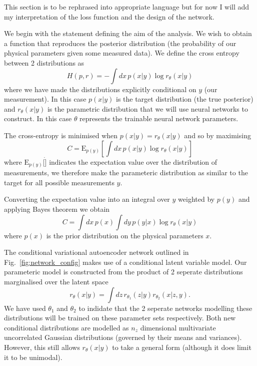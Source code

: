 \documentclass[%
showpacs,
 amsmath,amssymb,
 aps,
 twocolumn,
 prl,
 reprint,
floatfix,
]{revtex4-1}
\begin{document}
This section is to be rephrased into appropriate language but for now I will
add my interpretation of the loss function and the design of the network.

We begin with the statement defining the aim of the analysis. We wish to obtain
a function that reproduces the posterior distribution (the probability of our
physical parameters given some measured data). We define the cross entropy
between 2 distributions as
%
\begin{equation}\label{eq:cross_ent}
H(p,r) = -\int dx\, p(x|y) \log r_{\theta}(x|y)
\end{equation}
%
where we have made the distributions explicitly conditional on $y$ (our
measurement). In this case $p(x|y)$ is the target distribution (the true
posterior) and $r_{\theta}(x|y)$ is the parametric distribution that we will
use neural networks to construct. In this case $\theta$ represents the
trainable neural network parameters. 

The cross-entropy is minimised when $p(x|y)=r_{\theta}(x|y)$ and so by maximising
%
\begin{equation}\label{eq:cost1}
C = \text{E}_{p(y)}\left[\int dx\,p(x|y) \log r_{\theta}(x|y)\right]
\end{equation}
% 
where $\text{E}_{p(y)}[\dot]$ indicates the expectation value over the
distribution of measurements, we therefore make the parameteric distribution as
similar to the target for all possible measurements $y$.

Converting the expectation value into an integral over $y$ weighted by $p(y)$
and applying Bayes theorem we obtain
%
\begin{equation}\label{eq:cost1}
C = \int dx\,p(x)\int dy\,p(y|x)\log r_{\theta}(x|y)
\end{equation}
%
where $p(x)$ is the prior distribution on the physical parameters $x$.

The conditional variational autoencoder network outlined in
Fig.~\ref{fig:network_config} makes use of a conditional latent variable model.
Our parameteric model is constructed from the product of 2 seperate
distributions marginalised over the latent space
%
\begin{equation}\label{eq:latent_model}
r_{\theta}(x|y) = \int dz\,r_{\theta_{1}}(z|y)r_{\theta_{2}}(x|z,y).
\end{equation}
%  
We have used $\theta_{1}$ and $\theta_{2}$ to indidate that the 2 seperate
networks modelling these distributions will be trained on these parameter sets
respectively. Both new conditional distributions are modelled as $n_{z}$
dimensional multivariate uncorrelated Gaussian distributions (governed by their
means and variances). However, this still allows $r_{\theta}(x|y)$ to take a
general form (although it does limit it to be unimodal).  
\end{document}

